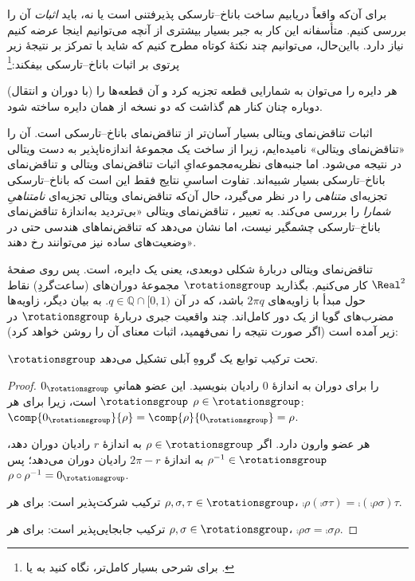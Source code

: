 \documentclass[../../../include/open-logic-section]{subfiles}
\begin{document}

برای آن‌که واقعاً دریابیم ساخت باناخ--تارسکی پذیرفتنی است یا نه،
باید \emph{اثبات} آن را بررسی کنیم. متأسفانه این کار به جبر بسیار
بیشتری از آنچه می‌توانیم اینجا عرضه کنیم نیاز دارد. بااین‌حال،
می‌توانیم چند نکتهٔ کوتاه مطرح کنیم که شاید با تمرکز بر نتیجهٔ زیر
پرتوی بر اثبات باناخ--تارسکی بیفکند:\footnote{برای شرحی بسیار
کامل‌تر، نگاه کنید به \cite{Weston2003} یا \cite{Wagon2016}.}

\begin{thm}
هر دایره را می‌توان به شمارایی قطعه تجزیه کرد و آن قطعه‌ها را (با
دوران و انتقال) دوباره چنان کنار هم گذاشت که دو نسخه از همان دایره
ساخته شود.
\end{thm}

اثبات تناقض‌نمای ویتالی بسیار آسان‌تر از تناقض‌نمای باناخ--تارسکی
است. آن را «تناقض‌نمای ویتالی» نامیده‌ایم، زیرا از ساخت یک مجموعهٔ
اندازه‌ناپذیر به دست ویتالی در \citeyear{Vitali1905} نتیجه می‌شود.
اما جنبه‌های نظریه‌مجموعه‌ایِ اثبات تناقض‌نمای ویتالی و تناقض‌نمای
باناخ--تارسکی بسیار شبیه‌اند. تفاوت اساسیِ نتایج فقط این است که
باناخ--تارسکی تجزیه‌ای \emph{متناهی} را در نظر می‌گیرد، حال آن‌که
تناقض‌نمای ویتالی تجزیه‌ای \emph{نامتناهیِ شمارا} را بررسی می‌کند.
به تعبیر \citet{Weston2003}، تناقض‌نمای ویتالی «بی‌تردید به‌اندازهٔ
تناقض‌نمای باناخ--تارسکی چشمگیر نیست، اما نشان می‌دهد که تناقض‌نماهای
هندسی حتی در وضعیت‌های ساده نیز می‌توانند رخ دهند».

تناقض‌نمای ویتالی دربارهٔ شکلی دوبعدی، یعنی یک دایره، است. پس روی
صفحهٔ $\Real^2$ کار می‌کنیم. بگذارید $\rotationsgroup$ مجموعهٔ
دوران‌های (ساعت‌گردِ) نقاط حول مبدأ با زاویه‌های
$2\pi q$ باشد، که در آن
$q \in \mathbb{Q}\cap[0,1)$. به بیان دیگر، زاویه‌ها مضرب‌های گویا
از یک دور کامل‌اند. چند واقعیت جبری دربارهٔ $\rotationsgroup$ در
زیر آمده است (اگر صورت نتیجه را نمی‌فهمید، اثبات معنای آن را روشن
خواهد کرد):

\begin{lem}
$\rotationsgroup$ تحت ترکیب توابع یک {گروهِ} آبلی تشکیل می‌دهد.
\end{lem}

\begin{proof}
$0_{\rotationsgroup}$ را برای دوران به اندازهٔ $0$ رادیان بنویسید.
این عضو همانیِ $\rotationsgroup$ است، زیرا برای هر
$\rho \in \rotationsgroup$:
$\comp{0_{\rotationsgroup}}{\rho} =
\comp{\rho}{0_{\rotationsgroup}} = \rho$.

هر عضو وارون دارد. اگر $\rho \in \rotationsgroup$ به اندازهٔ $r$
رادیان دوران دهد، $\rho^{-1} \in \rotationsgroup$ به اندازهٔ
$2\pi-r$ رادیان دوران می‌دهد؛ پس
$\rho \circ \rho^{-1} = 0_{\rotationsgroup}$.

ترکیب شرکت‌پذیر است: برای هر
$\rho, \sigma, \tau \in \rotationsgroup$،
$\comp{\rho}{(\comp{\sigma}{\tau})} =
\comp{(\comp{\rho}{\sigma})}{\tau}$.

ترکیب جابجایی‌پذیر است: برای هر
$\rho, \sigma \in \rotationsgroup$،
$\comp{\rho}{\sigma} = \comp{\sigma}{\rho}$.
\end{proof}
\end{document}

